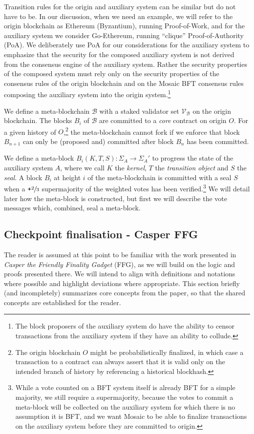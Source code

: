 \documentclass[12pt,a4paper]{article}
\begin{document}
Transition rules for the origin and auxiliary system can be similar but do not have to be.
In our discussion, when we need an example, we will refer to the origin blockchain as Ethereum (Byzantium), running Proof-of-Work, and for the auxiliary system we consider Go-Ethereum, running ``clique'' Proof-of-Authority (PoA).
We deliberately use PoA for our considerations for the auxiliary system to emphasize that the security for the composed auxiliary system is not derived from the consensus engine of the auxiliary system.
Rather the security properties of the composed system must rely only on the security properties of the consensus rules of the origin blockchain and on the Mosaic BFT consensus rules composing the auxiliary system into the origin system.\footnote{
	The block proposers of the auxiliary system do have the ability to censor transactions from the auxiliary system if they have an ability to collude.
}

We define a meta-blockchain $\mathcal{B}$ with a staked validator set $\mathcal{V}_\mathcal{B}$ on the origin blockchain. The blocks $B_i$ of $\mathcal{B}$ are committed to a \emph{core} contract on origin $O$.
For a given history of $O$,\footnote{
	The origin blockchain $O$ might be probabilistically finalized, in which case a transaction to a contract can always assert that it is valid only on the intended branch of history by referencing a historical blockhash.
}
the meta-blockchain cannot fork if we enforce that block $B_{n+1}$ can only be (proposed and) committed after block $B_n$ has been committed.

We define a meta-block $B_i(K, T, S): \Sigma_A \rightarrow \Sigma_A'$ to progress the state of the auxiliary system $A$, where we call $K$ the \emph{kernel}, $T$ the \emph{transition object} and $S$ the \emph{seal}.
A block $B_i$ at height $i$ of the meta-blockchain is committed with a seal $S$ when a $\texttt{+}\sfrac{2}{3}$ supermajority of the weighted votes has been verified.\footnote{
	While a vote counted on a BFT system itself is already BFT for a simple majority, %
	we still require a supermajority, because the votes to commit a meta-block will be collected on the auxiliary system for which there is no assumption it is BFT, and we want Mosaic to be able to finalize transactions on the auxiliary system before they are committed to origin.
}
We will detail later how the meta-block is constructed, but first we will describe the vote messages which, combined, seal a meta-block.

\subsection{Checkpoint finalisation - Casper FFG}
The reader is assumed at this point to be familiar with the work presented in \textit{Casper the Friendly Finality Gadget}\cite{casperffg} (FFG), as we will build on the logic and proofs presented there.
We will intend to align with definitions and notations where possible and highlight deviations where appropriate.
This section briefly (and incompletely) summarizes core concepts from the paper, so that the shared concepts are established for the reader.
\end{document}
